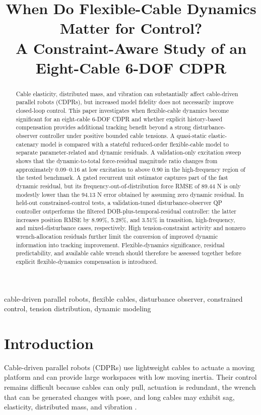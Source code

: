 \documentclass[conference]{IEEEtran}
\title{When Do Flexible-Cable Dynamics Matter for Control?\\A Constraint-Aware Study of an Eight-Cable 6-DOF CDPR}
\author{\IEEEauthorblockN{M. J. Tachia}\IEEEauthorblockA{Affiliation to be completed for the conference submission\\Email to be added}}
\begin{document}
\maketitle
\begin{abstract}
Cable elasticity, distributed mass, and vibration can substantially affect cable-driven parallel robots (CDPRs), but increased model fidelity does not necessarily improve closed-loop control. This paper investigates when flexible-cable dynamics become significant for an eight-cable 6-DOF CDPR and whether explicit history-based compensation provides additional tracking benefit beyond a strong disturbance-observer controller under positive bounded cable tensions. A quasi-static elastic-catenary model is compared with a stateful reduced-order flexible-cable model to separate parameter-related and dynamic residuals. A validation-only excitation sweep shows that the dynamic-to-total force-residual magnitude ratio changes from approximately 0.09--0.16 at low excitation to above 0.90 in the high-frequency region of the tested benchmark. A gated recurrent unit estimator captures part of the fast dynamic residual, but its frequency-out-of-distribution force RMSE of 89.44 N is only modestly lower than the 94.13 N error obtained by assuming zero dynamic residual. In held-out constrained-control tests, a validation-tuned disturbance-observer QP controller outperforms the filtered DOB-plus-temporal-residual controller: the latter increases position RMSE by 8.99\%, 5.28\%, and 3.51\% in transition, high-frequency, and mixed-disturbance cases, respectively. High tension-constraint activity and nonzero wrench-allocation residuals further limit the conversion of improved dynamic information into tracking improvement. Flexible-dynamics significance, residual predictability, and available cable wrench should therefore be assessed together before explicit flexible-dynamics compensation is introduced.
\end{abstract}
\begin{IEEEkeywords}
cable-driven parallel robots, flexible cables, disturbance observer, constrained control, tension distribution, dynamic modeling
\end{IEEEkeywords}

\section{Introduction}
Cable-driven parallel robots (CDPRs) use lightweight cables to actuate a moving platform and can provide large workspaces with low moving inertia. Their control remains difficult because cables can only pull, actuation is redundant, the wrench that can be generated changes with pose, and long cables may exhibit sag, elasticity, distributed mass, and vibration \cite{Zarebidoki2022,TachiaReview2026}.
\end{document}
